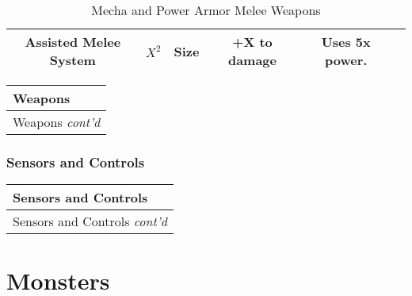 \documentclass[twoside]{book}
\begin{document}
\begin{table}[htb]
\begin{center}
\begin{tabular}{|c|c|c|c|c|c|}
\hline

 Assisted Melee System &  \begin{math}
                      {X}^{ 2 }\end{math}  
                  & Size & +X to damage & Uses 5x power. \\

\hline


  \end{tabular}
  
\caption{Mecha and Power Armor Melee Weapons}
  
  \end{center}
\end{table}
  
\begin{longtable}{p{1.25in}} 
  Weapons
  \\
  \hline
  \hline
  \endfirsthead
  Weapons \textit{cont'd}
        
  \\
  \hline
  \endhead
      
\end{longtable}
    
\begin{multicols}{2}
\hspace{-1.75ex}
    
\end{multicols}
  
    

\subsection{Sensors and Controls}
    
\begin{longtable}{p{1.25in}} 
  Sensors and Controls
  \\
  \hline
  \hline
  \endfirsthead
  Sensors and Controls \textit{cont'd}
        
  \\
  \hline
  \endhead
      
\end{longtable}
    
\begin{multicols}{2}
\hspace{-1.75ex}
    
\end{multicols}
  
    

\chapter{Monsters}
    
\end{document}
